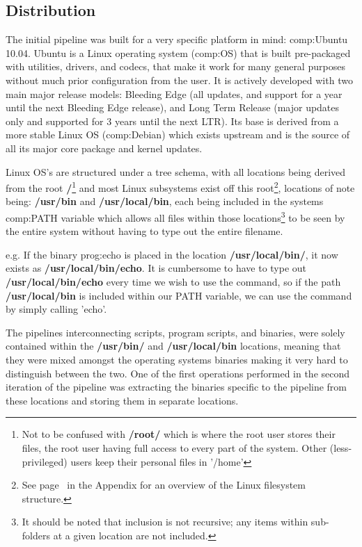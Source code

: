 \subsection{Distribution}

The initial pipeline was built for a very specific platform in mind: \gls{comp:Ubuntu} 10.04. Ubuntu is a Linux operating system (\gls{comp:OS}) that is built pre-packaged with utilities, drivers, and codecs, that make it work for many general purposes without much prior configuration from the user. It is actively developed with two main major release models: Bleeding Edge (all updates, and support for a year until the next Bleeding Edge release), and Long Term Release (major updates only and supported for 3 years until the next LTR).  Its base is derived from a more stable Linux OS (\gls{comp:Debian}) which exists upstream and is the source of all its major core package and kernel updates.

Linux OS's are structured under a tree schema, with all locations being derived from the root \textbf{/}\footnote{Not to be confused with \textbf{/root/} which is where the root user stores their files, the root user having full access to every part of the system. Other (less-privileged) users keep their personal files in '/home'} and most Linux subsystems exist off this root\footnote{See page~\pageref{ref:app:semaphores} in the Appendix for an overview of the Linux filesystem structure.}, locations of note being: \textbf{/usr/bin} and \textbf{/usr/local/bin}, each being included in the systems \gls{comp:PATH} variable which allows all files within those locations\footnote{It should be noted that inclusion is not recursive; any items within sub-folders at a given location are not included.} to be seen by the entire system without having to type out the entire filename.

e.g. If the binary \gls{prog:echo} is placed in the location \textbf{/usr/local/bin/}, it now exists as \textbf{/usr/local/bin/echo}. It is cumbersome to have to type out \textbf{/usr/local/bin/echo} every time we wish to use the command, so if the path \textbf{/usr/local/bin} is included within our PATH variable, we can use the command by simply calling 'echo'.

The pipelines interconnecting scripts, program scripts, and binaries, were solely contained within the \textbf{/usr/bin/} and \textbf{/usr/local/bin} locations, meaning that they were mixed amongst the operating systems binaries making it very hard to distinguish between the two. One of the first operations performed in the second iteration of the pipeline was extracting the binaries specific to the pipeline from these locations and storing them in separate locations. 

